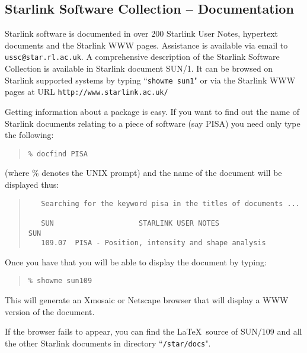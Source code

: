 \documentclass[twoside,11pt]{article}
\newcommand{\htmladdnormallink}[2]{#1}
\newcommand{\xref}[3]{#1}
\newcommand{\xlabel}[1]{}
\newcommand{\STARLINKref}{\htmladdnormallink{Starlink}{http://www.starlink.ac.uk/}}
\newcommand{\PISAref}{\xref{PISA}{sun109}{}}
\newcommand{\PISASUNref}{\xref{SUN/109}{sun109}{}}
\newcommand{\SUNONEref}{\xref{SUN/1}{sun1}{}}
\newcommand{\STARLINKWWWref}{\htmladdnormallink{Starlink WWW}{http://www.starlink.ac.uk/}}
\newcommand{\HTTPAref}{\htmladdnormallink{\tt http://www.starlink.ac.uk/}{http://www.starlink.ac.uk/}}
\begin{document}
\subsection{{\STARLINKref} Software Collection -- Documentation} \xlabel{SSC}
\label{sec:ssc}

{\STARLINKref} software is documented in over 200 Starlink User Notes, hypertext
documents and the {\STARLINKWWWref} pages. Assistance is available
via email to {\tt ussc@star.rl.ac.uk}.
A comprehensive description of the Starlink Software
Collection is available in Starlink document {\SUNONEref}. It can be
browsed on Starlink supported systems by typing ``{\tt showme sun1}" or via the
Starlink WWW pages at URL {\HTTPAref}

Getting information about a package is easy. If you want to find out the
name of Starlink documents relating to a piece of software (say
{\PISAref}) you need only type the following:

\begin{quote}
\begin{verbatim}
% docfind PISA
\end{verbatim}
\end{quote}

(where \% denotes the UNIX prompt) and the name of the document
will be displayed thus:

\begin{quote}
\begin{verbatim}
   Searching for the keyword pisa in the titles of documents ...

   SUN                    STARLINK USER NOTES                       SUN
   109.07  PISA - Position, intensity and shape analysis
\end{verbatim}
\end{quote}

Once you have that you will be able to display the document by typing:

\begin{quote}
\begin{verbatim}
% showme sun109
\end{verbatim}
\end{quote}

This will generate an Xmosaic or Netscape browser that will display
a WWW version of the document.

If the browser fails to appear, you can find the \LaTeX\ source of {\PISASUNref}
and all the other Starlink documents in directory ``{\tt /star/docs}".
\end{document}
